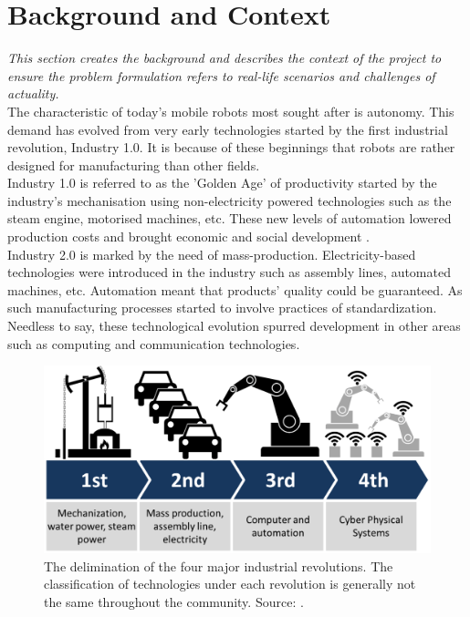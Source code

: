 \label{}
\section{Background and Context}
\textit{This section creates the background and describes the context of the project to ensure the problem formulation refers to real-life scenarios and challenges of actuality.}\\

The characteristic of today's mobile robots most sought after is autonomy. This demand has evolved from very early technologies started by the first industrial revolution, Industry 1.0. It is because of these beginnings that robots are rather designed for manufacturing than other fields. \\

Industry 1.0 is referred to as the 'Golden Age' of productivity started by the industry's mechanisation using non-electricity powered technologies such as the steam engine, motorised machines, etc. These new levels of automation lowered production costs and brought economic and social development \cite{uk}.\\


Industry 2.0 is marked by the need of mass-production. Electricity-based technologies were introduced in the industry such as assembly lines, automated machines, etc. Automation meant that products' quality could be guaranteed. As such manufacturing processes started to involve practices of standardization. Needless to say, these technological evolution spurred development in other areas such as computing and communication technologies. \cite{uk}\\


\begin{figure}[H]
\includegraphics[scale=0.4]{Figures/industry4.png}
\centering
\caption{The delimination of the four major industrial revolutions. The classification of technologies under each revolution is generally not the same throughout the community. Source: \cite{site}.}
\label{industry4}
\end{figure}


